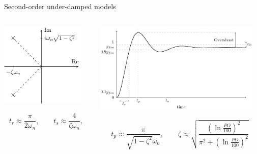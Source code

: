\documentclass[presentation,aspectratio=169]{beamer}
\begin{document}
\begin{frame}[label={sec:org6ca1ae1}]{Second-order under-damped models}
\begin{columns}
\begin{column}{0.3\columnwidth}
\begin{center}
    \includegraphics[width=4cm]{../../figures/implane-second-order-poles}
\end{center}

\[    t_r \approx \frac{\pi}{2\omega_n}, \qquad   t_s \approx \frac{4}{\zeta\omega_n}, \]
\end{column}
\begin{column}{0.7\columnwidth}
\begin{center}
    \includegraphics[width=8cm]{../../figures/step-response-specifications}
\end{center}

\[    t_p \approx \frac{\pi}{\sqrt{1 - \zeta^2}\omega_n}, \qquad    \zeta \approx \sqrt{\frac{(\ln \frac{PO}{100})^2}{\pi^2 + (\ln \frac{PO}{100})^2}} \]
\end{column}
\end{columns}
\end{frame}
\end{document}
